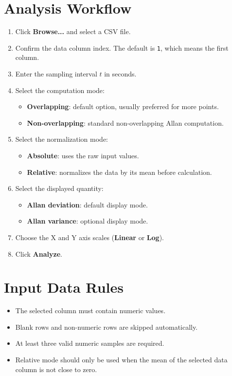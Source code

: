 \documentclass[11pt,a4paper]{article}
\begin{document}
\section{Analysis Workflow}
\begin{enumerate}[leftmargin=1.5em]
    \item Click \textbf{Browse...} and select a CSV file.
    \item Confirm the data column index. The default is \texttt{1}, which means the first column.
    \item Enter the sampling interval \(t\) in seconds.
    \item Select the computation mode:
    \begin{itemize}[leftmargin=1.5em]
        \item \textbf{Overlapping}: default option, usually preferred for more points.
        \item \textbf{Non-overlapping}: standard non-overlapping Allan computation.
    \end{itemize}
    \item Select the normalization mode:
    \begin{itemize}[leftmargin=1.5em]
        \item \textbf{Absolute}: uses the raw input values.
        \item \textbf{Relative}: normalizes the data by its mean before calculation.
    \end{itemize}
    \item Select the displayed quantity:
    \begin{itemize}[leftmargin=1.5em]
        \item \textbf{Allan deviation}: default display mode.
        \item \textbf{Allan variance}: optional display mode.
    \end{itemize}
    \item Choose the X and Y axis scales (\textbf{Linear} or \textbf{Log}).
    \item Click \textbf{Analyze}.
\end{enumerate}

\section{Input Data Rules}
\begin{itemize}[leftmargin=1.5em]
    \item The selected column must contain numeric values.
    \item Blank rows and non-numeric rows are skipped automatically.
    \item At least three valid numeric samples are required.
    \item Relative mode should only be used when the mean of the selected data column is not close to zero.
\end{itemize}
\end{document}
